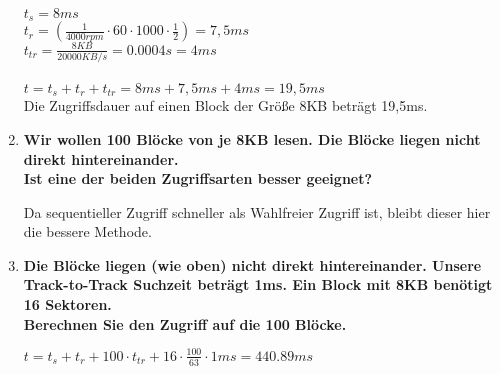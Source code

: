 \documentclass{scrartcl}
\begin{document}
\begin{enumerate}
    $t_s=8ms$\\
    $t_r=(\frac{1}{4000 rpm}\cdot 60 \cdot 1000 \cdot \frac{1}{2})=7,5ms$\\
    $t_{tr} = \frac{8KB}{20000KB/s} = 0.0004 s = 4ms$\\\\
    $t=t_s+t_r+t_{tr}=8ms+7,5ms+4ms=19,5ms$\\
    Die Zugriffsdauer auf einen Block der Größe 8KB beträgt 19,5ms.
    \item \textbf{Wir wollen 100 Blöcke von je 8KB lesen. Die Blöcke liegen nicht direkt hintereinander.}\\\textbf{Ist eine der beiden Zugriffsarten besser geeignet?}
    
    Da sequentieller Zugriff schneller als Wahlfreier Zugriff ist, bleibt dieser hier die bessere Methode.
    \item \textbf{Die Blöcke liegen (wie oben) nicht direkt hintereinander. Unsere Track-to-Track Suchzeit beträgt 1ms. Ein Block mit 8KB benötigt 16 Sektoren.}\\\textbf{Berechnen Sie den Zugriff auf die 100 Blöcke.}
    
    $t = t_s + t_r + 100 \cdot t_{tr} + 16 \cdot \frac{100}{63} \cdot 1ms = 440.89ms$
\end{enumerate}
\end{document}
